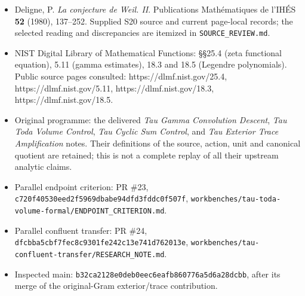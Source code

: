 \begin{itemize}
\tightlist
\item
  Deligne, P. \emph{La conjecture de Weil. II}. Publications Mathématiques de l'IHÉS \textbf{52} (1980), 137--252. Supplied S20 source and current page-local records; the selected reading and discrepancies are itemized in \texttt{SOURCE\_REVIEW.md}.
\item
  NIST Digital Library of Mathematical Functions: §§25.4 (zeta functional equation), 5.11 (gamma estimates), 18.3 and 18.5 (Legendre polynomials). Public source pages consulted: https://dlmf.nist.gov/25.4, https://dlmf.nist.gov/5.11, https://dlmf.nist.gov/18.3, https://dlmf.nist.gov/18.5.
\item
  Original programme: the delivered \emph{Tau Gamma Convolution Descent}, \emph{Tau Toda Volume Control}, \emph{Tau Cyclic Sum Control}, and \emph{Tau Exterior Trace Amplification} notes. Their definitions of the source, action, unit and canonical quotient are retained; this is not a complete replay of all their upstream analytic claims.
\item
  Parallel endpoint criterion: PR \#23, \texttt{c720f40530eed2f5969dbabe94dfd3fddc0f507f}, \texttt{workbenches/tau-toda-volume-formal/ENDPOINT\_CRITERION.md}.
\item
  Parallel confluent transfer: PR \#24, \texttt{dfcbba5cbf7fec8c9301fe242c13e741d762013e}, \texttt{workbenches/tau-confluent-transfer/RESEARCH\_NOTE.md}.
\item
  Inspected main: \texttt{b32ca2128e0deb0eec6eafb860776a5d6a28dcbb}, after its merge of the original-Gram exterior/trace contribution.
\end{itemize}

